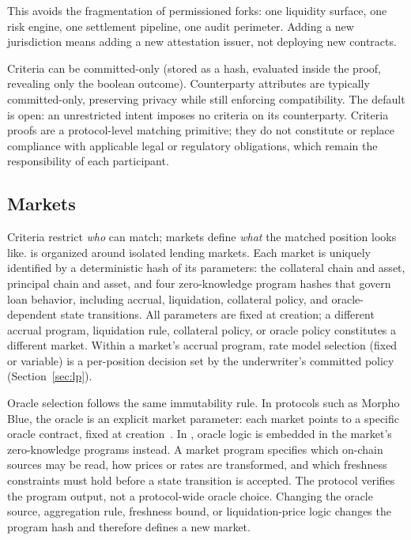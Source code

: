 This avoids the fragmentation of permissioned forks: one liquidity surface, one risk engine, one settlement pipeline, one audit perimeter. Adding a new jurisdiction means adding a new attestation issuer, not deploying new contracts.

Criteria can be committed-only (stored as a hash, evaluated inside the proof, revealing only the boolean outcome). Counterparty attributes are typically committed-only, preserving privacy while still enforcing compatibility. The default is open: an unrestricted intent imposes no criteria on its counterparty. Criteria proofs are a protocol-level matching primitive; they do not constitute or replace compliance with applicable legal or regulatory obligations, which remain the responsibility of each participant.

\subsection{Markets}

Criteria restrict \emph{who} can match; markets define \emph{what} the matched position looks like. \daloc{} is organized around isolated lending markets. Each market is uniquely identified by a deterministic hash of its parameters: the collateral chain and asset, principal chain and asset, and four zero-knowledge program hashes that govern loan behavior, including accrual, liquidation, collateral policy, and oracle-dependent state transitions. All parameters are fixed at creation; a different accrual program, liquidation rule, collateral policy, or oracle policy constitutes a different market. Within a market's accrual program, rate model selection (fixed or variable) is a per-position decision set by the underwriter's committed policy (Section~\ref{sec:lp}).

Oracle selection follows the same immutability rule. In protocols such as Morpho Blue, the oracle is an explicit market parameter: each market points to a specific oracle contract, fixed at creation~\cite{morphoblue2023}. In \daloc{}, oracle logic is embedded in the market's zero-knowledge programs instead. A market program specifies which on-chain sources may be read, how prices or rates are transformed, and which freshness constraints must hold before a state transition is accepted. The protocol verifies the program output, not a protocol-wide oracle choice. Changing the oracle source, aggregation rule, freshness bound, or liquidation-price logic changes the program hash and therefore defines a new market.

